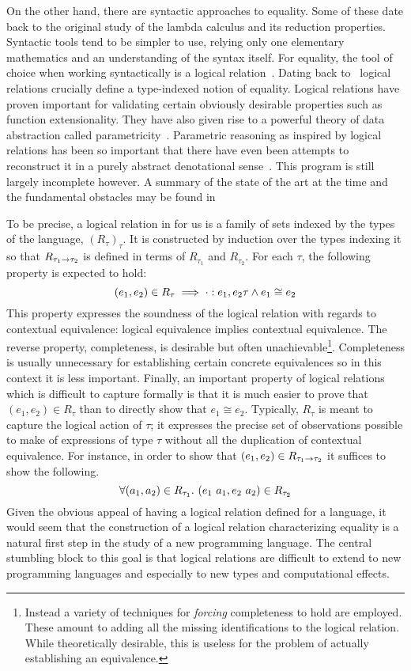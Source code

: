 On the other hand, there are syntactic approaches to equality. Some of
these date back to the original study of the lambda calculus and its
reduction properties. Syntactic tools tend to be simpler to use,
relying only one elementary mathematics and an understanding of the
syntax itself. For equality, the tool of choice when working
syntactically is a logical
relation~\citep{Tait:67,Girard:72,Pitts:98,Appel:01,Ahmed:04,Ahmed:06,Appel:07,Dreyer:09,Dreyer:10}.
Dating back to~\citet{Tait:67} logical relations crucially define a
type-indexed notion of equality. Logical relations have proven
important for validating certain obviously desirable properties such
as function extensionality. They have also given rise to a powerful
theory of data abstraction called
parametricity~\citep{Reynolds:83}. Parametric reasoning as inspired by
logical relations has been so important that there have even been
attempts to reconstruct it in a purely abstract denotational
sense~\citep{Bainbridge:90,Abadi:90,Ma:91,Birkedal:05,Dunphy:04}. This
program is still largely incomplete however. A summary of the state of
the art at the time and the fundamental obstacles may be found in
\citet{Hermida:14}

To be precise, a logical relation in for us is a family of sets
indexed by the types of the language, $(R_\tau)_\tau$. It is
constructed by induction over the types indexing it so that
$R_{\tau_1 \to \tau_2}$ is defined in terms of $R_{\tau_1}$ and
$R_{\tau_2}$. For each $\tau$, the following property is expected to
hold:
\[
  (e_1, e_2) \in R_\tau \implies
  \cdot \mathrel{:} e_1, e_2{\tau} \land e_1 \cong e_2
\]
This property expresses the soundness of the logical relation with
regards to contextual equivalence: logical equivalence implies
contextual equivalence. The reverse property, completeness, is
desirable but often unachievable\footnote{Instead a variety of
  techniques for \emph{forcing} completeness to hold are
  employed. These amount to adding all the missing identifications to
  the logical relation. While theoretically desirable, this is useless
  for the problem of actually establishing an
  equivalence.}. Completeness is usually unnecessary for establishing
certain concrete equivalences so in this context it is less
important. Finally, an important property of logical relations which
is difficult to capture formally is that it is much easier to prove
that $(e_1, e_2) \in R_\tau$ than to directly show that
$e_1 \cong e_2$. Typically, $R_\tau$ is meant to capture the logical
action of $\tau$; it expresses the precise set of observations
possible to make of expressions of type $\tau$ without all the
duplication of contextual equivalence. For instance, in order to show
that $(e_1, e_2) \in R_{\tau_1 \to \tau_2}$ it suffices to show the
following.
\[
  \forall (a_1, a_2) \in R_{\tau_1}.
  \ (e_1\ a_1, e_2\ a_2) \in R_{\tau_2}
\]
Given the obvious appeal of having a logical relation defined for a
language, it would seem that the construction of a logical relation
characterizing equality is a natural first step in the study of a new
programming language. The central stumbling block to this goal is that
logical relations are difficult to extend to new programming languages
and especially to new types and computational effects.

